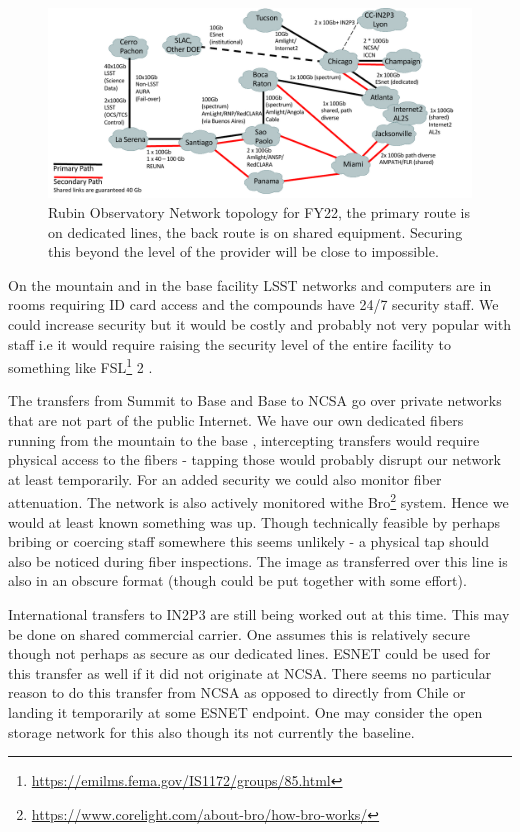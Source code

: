\begin{figure}
\begin{center}
\includegraphics[width=1.0\textwidth]{NetworksFY22}
\caption{Rubin Observatory Network topology for FY22, the primary route is on dedicated lines, the back route is on shared equipment. Securing this beyond the level of the provider will be close to impossible.  \label{fig:net}}
\end{center}
\end{figure}

On the mountain and in the base facility LSST networks and computers are in rooms requiring ID card access and the compounds
have 24/7 security staff.
We could increase security but it would be costly and probably not very popular with staff i.e it would require raising the security level of the entire facility to something like FSL\footnote{\url{https://emilms.fema.gov/IS1172/groups/85.html}} 2 .

The transfers from Summit to Base and Base to NCSA go over private networks that are not part of the public Internet. We have our own dedicated fibers running from the mountain to the base ,
intercepting transfers would require physical access to the fibers - tapping those would probably disrupt our network at least temporarily.
For an added security we could also monitor fiber attenuation.
The network is also actively monitored withe Bro\footnote{\url{https://www.corelight.com/about-bro/how-bro-works/}} system. Hence we would at least known something was up.
Though technically feasible by perhaps bribing or coercing staff somewhere this seems unlikely - a physical tap should also be noticed during fiber inspections.  The image as transferred over this line is also in an obscure format (though could be put together with some effort).


International transfers to IN2P3 are still being worked out at this time. This may be done on shared commercial carrier. One assumes
this is relatively secure though not perhaps as secure as our dedicated lines. ESNET could be used for this transfer as well if it did not originate at NCSA. There seems no particular reason to do this transfer from NCSA as opposed to directly from Chile or landing it
temporarily at some ESNET endpoint. One may consider the open storage network \citep{osn} for this also though its not currently the baseline.



